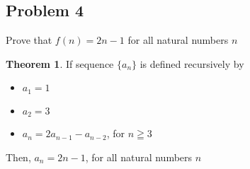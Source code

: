 \documentclass{book}
\theoremstyle{definition}
\newtheorem{theorem}{Theorem}[section]
\begin{document}
\newpage
\subsection{Problem 4}
Prove that $f(n) = 2n - 1$ for all natural numbers $n$ 

\begin{tcolorbox}
    \begin{theorem}
        If sequence $\{ a_n \}$ is defined recursively by 
            \begin{itemize}
                \item $a_1 = 1$
                \item $a_2 = 3$
                \item $a_n = 2a_{n-1} - a_{n-2}$, for $n \geqq 3$
            \end{itemize}
        Then, $a_n = 2n - 1$, for all natural numbers $n$

    \end{theorem}
\end{tcolorbox}
\end{document}
